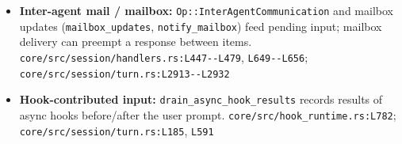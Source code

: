 \begin{itemize}
\item \textbf{Inter-agent mail / mailbox:} \texttt{Op:\allowbreak{}:\allowbreak{}InterAgentCommunication} and mailbox updates (\texttt{mailbox\_\allowbreak{}updates}, \texttt{notify\_\allowbreak{}mailbox}) feed pending input; mailbox delivery can preempt a response between items. \texttt{core/\allowbreak{}src/\allowbreak{}session/\allowbreak{}handlers.\allowbreak{}rs:\allowbreak{}L447-\allowbreak{}-\allowbreak{}L479}, \texttt{L649-\allowbreak{}-\allowbreak{}L656}; \texttt{core/\allowbreak{}src/\allowbreak{}session/\allowbreak{}turn.\allowbreak{}rs:\allowbreak{}L2913-\allowbreak{}-\allowbreak{}L2932}
\item \textbf{Hook-contributed input:} \texttt{drain\_\allowbreak{}async\_\allowbreak{}hook\_\allowbreak{}results} records results of async hooks before/after the user prompt. \texttt{core/\allowbreak{}src/\allowbreak{}hook\_\allowbreak{}runtime.\allowbreak{}rs:\allowbreak{}L782}; \texttt{core/\allowbreak{}src/\allowbreak{}session/\allowbreak{}turn.\allowbreak{}rs:\allowbreak{}L185}, \texttt{L591}
\end{itemize}

